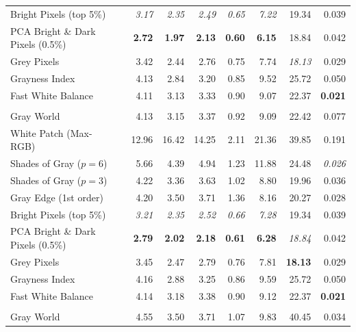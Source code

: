 \begin{longtable}{@{}>{\raggedright\arraybackslash}p{6.8cm}rrrrrrr@{}}
Bright Pixels (top 5\%)~\cite{bright_pixels} & \textit{3.17} & \textit{2.35} & \textit{2.49} & \textit{0.65} & \textit{7.22} & 19.34 & 0.039 \\
PCA Bright \& Dark Pixels (0.5\%)~\cite{cheng2014illuminant} & \textbf{2.72} & \textbf{1.97} & \textbf{2.13} & \textbf{0.60} & \textbf{6.15} & 18.84 & 0.042 \\
Grey Pixels~\cite{yangGrayPixels} & 3.42 & 2.44 & 2.76 & 0.75 & 7.74 & \textit{18.13} & 0.029 \\
Grayness Index~\cite{qianFindingGrayPixels} & 4.13 & 2.84 & 3.20 & 0.85 & 9.52 & 25.72 & 0.050 \\
Fast White Balance~\cite{fast_wb_greyness} & 4.11 & 3.13 & 3.33 & 0.90 & 9.07 & 22.37 & \textbf{0.021} \\
\midrule
\multicolumn{8}{@{}l}{\textbf{NUS 8-Camera (extended)~\cite{cheng2014illuminant} ($N=1853$)}} \\
\midrule
Gray World~\cite{gray_world} & 4.13 & 3.15 & 3.37 & 0.92 & 9.09 & 22.42 & 0.077 \\
White Patch (Max-RGB)~\cite{white_patch} & 12.96 & 16.42 & 14.25 & 2.11 & 21.36 & 39.85 & 0.191 \\
Shades of Gray ($p=6$)~\cite{shades_of_gray} & 5.66 & 4.39 & 4.94 & 1.23 & 11.88 & 24.48 & \textit{0.026} \\
Shades of Gray ($p=3$)~\cite{shades_of_gray} & 4.22 & 3.36 & 3.63 & 1.02 & 8.80 & 19.96 & 0.036 \\
Gray Edge (1st order)~\cite{gray_edge} & 4.20 & 3.50 & 3.71 & 1.36 & 8.16 & 20.27 & 0.028 \\
Bright Pixels (top 5\%)~\cite{bright_pixels} & \textit{3.21} & \textit{2.35} & \textit{2.52} & \textit{0.66} & \textit{7.28} & 19.34 & 0.039 \\
PCA Bright \& Dark Pixels (0.5\%)~\cite{cheng2014illuminant} & \textbf{2.79} & \textbf{2.02} & \textbf{2.18} & \textbf{0.61} & \textbf{6.28} & \textit{18.84} & 0.042 \\
Grey Pixels~\cite{yangGrayPixels} & 3.45 & 2.47 & 2.79 & 0.76 & 7.81 & \textbf{18.13} & 0.029 \\
Grayness Index~\cite{qianFindingGrayPixels} & 4.16 & 2.88 & 3.25 & 0.86 & 9.59 & 25.72 & 0.050 \\
Fast White Balance~\cite{fast_wb_greyness} & 4.14 & 3.18 & 3.38 & 0.90 & 9.12 & 22.37 & \textbf{0.021} \\
\midrule
\multicolumn{8}{@{}l}{\textbf{LSMI~\cite{kim2021lsmi} ($N=3396$)}} \\
\midrule
Gray World~\cite{gray_world} & 4.55 & 3.50 & 3.71 & 1.07 & 9.83 & 40.45 & 0.034 \\

\end{longtable}
